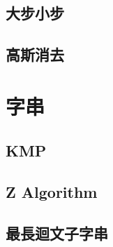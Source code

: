     \subsection{大步小步}
        
    \columnbreak
    \subsection{高斯消去}
        
        
    \columnbreak

\section{字串}
    \subsection{KMP}
        
    \subsection{Z Algorithm}
        
    \columnbreak
    \subsection{最長迴文子字串}
        
    \columnbreak

%         
%         
    
